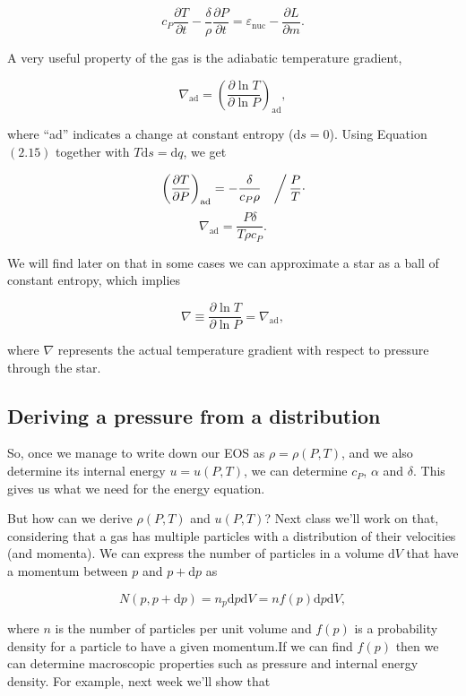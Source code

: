 \documentclass[twocolumn]{article}
\begin{document}
\[\boxed{c_P\frac{\partial T}{\partial t}-\frac{\delta}{\rho}\frac{\partial P}{\partial t}=\varepsilon_\mathrm{nuc}-\frac{\partial L}{\partial m}.}\]

A very useful property of the gas is the adiabatic temperature gradient,

\[\nabla_\mathrm{ad}=\left(\frac{\partial \ln T}{\partial \ln P}\right)_\mathrm{ad},\]

where ``ad'' indicates a change at constant entropy (\(\mathrm{d}s=0\)).
Using Equation \((2.15)\) together with \(T\mathrm{d}s=\mathrm{d}q\), we
get

\[\left.\left(\frac{\partial T}{\partial P}\right)_\mathrm{ad}=-\frac{\delta}{c_P\rho}\quad\right/\frac{P}{T}\cdot\]
\[\boxed{\nabla_\mathrm{ad}=\frac{P\delta}{T\rho c_P}.}\]

We will find later on that in some cases we can approximate a star as a
ball of constant entropy, which implies

\[\nabla\equiv\frac{\partial \ln T}{\partial \ln P}=\nabla_\mathrm{ad},\]

where \(\nabla\) represents the actual temperature gradient with respect
to pressure through the star.

\hypertarget{deriving-a-pressure-from-a-distribution}{%
\subsection{Deriving a pressure from a
distribution}\label{deriving-a-pressure-from-a-distribution}}

So, once we manage to write down our EOS as \(\rho=\rho(P,T)\), and we
also determine its internal energy \(u=u(P,T)\), we can determine
\(c_P\), \(\alpha\) and \(\delta\). This gives us what we need for the
energy equation.

But how can we derive \(\rho(P,T)\) and \(u(P,T)\)? Next class we'll
work on that, considering that a gas has multiple particles with a
distribution of their velocities (and momenta). We can express the
number of particles in a volume \(\mathrm{d}V\) that have a momentum
between \(p\) and \(p+\mathrm{d}p\) as

\[N(p,p+\mathrm{d}p)=n_p\mathrm{d}p\mathrm{d}V=nf(p)\mathrm{d}p\mathrm{d}V,\]

where \(n\) is the number of particles per unit volume and \(f(p)\) is a
probability density for a particle to have a given momentum.If we can
find \(f(p)\) then we can determine macroscopic properties such as
pressure and internal energy density. For example, next week we'll show
that
\end{document}
